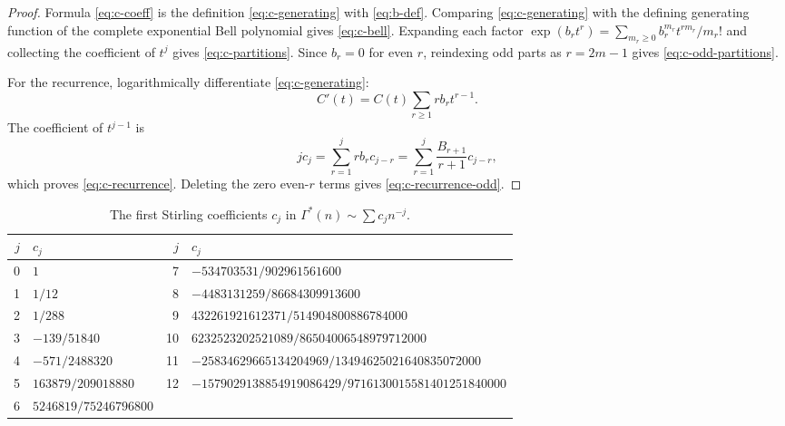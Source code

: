 \documentclass[11pt,a4paper,oneside]{article}
\theoremstyle{definition}
\theoremstyle{remark}
\newcommand{\GammaStar}{\Gamma^{\!*}}
\begin{document}
\begin{proof}
Formula \cref{eq:c-coeff} is the definition \cref{eq:c-generating} with
\cref{eq:b-def}.  Comparing \cref{eq:c-generating} with the defining
generating function of the complete exponential Bell polynomial gives
\cref{eq:c-bell}.  Expanding each factor
\(
 \exp(b_rt^r)=\sum_{m_r\ge0}b_r^{m_r}t^{rm_r}/m_r!
\)
and collecting the coefficient of $t^j$ gives
\cref{eq:c-partitions}.  Since $b_r=0$ for even $r$, reindexing odd parts as
$r=2m-1$ gives \cref{eq:c-odd-partitions}.

For the recurrence, logarithmically differentiate \cref{eq:c-generating}:
\[
 C'(t)=C(t)\sum_{r\ge1}r b_rt^{r-1}.
\]
The coefficient of $t^{j-1}$ is
\[
 jc_j=\sum_{r=1}^{j}r b_r c_{j-r}
 =\sum_{r=1}^{j}\frac{B_{r+1}}{r+1}c_{j-r},
\]
which proves \cref{eq:c-recurrence}.  Deleting the zero even-$r$ terms gives
\cref{eq:c-recurrence-odd}.
\end{proof}

\begin{table}[htbp]
\centering
\caption{The first Stirling coefficients $c_j$ in
$\GammaStar(n)\sim\sum c_jn^{-j}$.}
\label{tab:stirling-coefficients}
\small
\begin{tabular}{@{}r l r l@{}}
\toprule
$j$ & $c_j$ & $j$ & $c_j$\\
\midrule
0 & $1$ & 7 & $-534703531/902961561600$\\
1 & $1/12$ & 8 & $-4483131259/86684309913600$\\
2 & $1/288$ & 9 & $432261921612371/514904800886784000$\\
3 & $-139/51840$ & 10 & $6232523202521089/86504006548979712000$\\
4 & $-571/2488320$ & 11 & $-25834629665134204969/13494625021640835072000$\\
5 & $163879/209018880$ & 12 & $-1579029138854919086429/9716130015581401251840000$\\
6 & $5246819/75246796800$ & & \\
\bottomrule
\end{tabular}
\end{table}
\end{document}
